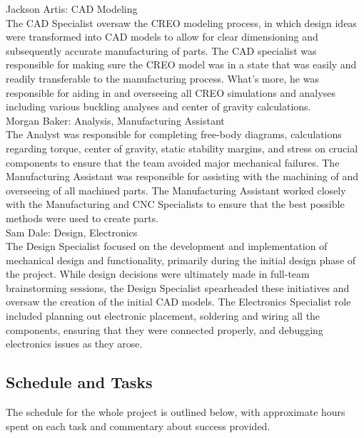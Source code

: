 Jackson Artis: CAD Modeling\\
    
    The CAD Specialist oversaw the CREO modeling process, in which design ideas were transformed into CAD models to allow for clear dimensioning and subsequently accurate manufacturing of parts. The CAD specialist was responsible for making sure the CREO model was in a state that was easily and readily transferable to the manufacturing process. What's more, he was responsible for aiding in and overseeing all CREO simulations and analyses including various buckling analyses and center of gravity calculations. \\ 

Morgan Baker: Analysis, Manufacturing Assistant\\

    The Analyst was responsible for completing free-body diagrams, calculations regarding torque, center of gravity, static stability margins, and stress on crucial components to ensure that the team avoided major mechanical failures. The Manufacturing Assistant was responsible for assisting with the machining of and overseeing of all machined parts. The Manufacturing Assistant worked closely with the Manufacturing and CNC Specialists to ensure that the best possible methods were used to create parts.\\
    
Sam Dale: Design, Electronics\\

    The Design Specialist focused on the development and implementation of mechanical design and functionality, primarily during the initial design phase of the project. While design decisions were ultimately made in full-team brainstorming sessions, the Design Specialist spearheaded these initiatives and oversaw the creation of the initial CAD models. The Electronics Specialist role included planning out electronic placement, soldering and wiring all the components, ensuring that they were connected properly, and debugging electronics issues as they arose.
    

\subsection{Schedule and Tasks}

The schedule for the whole project is outlined below, with approximate hours spent on each task and commentary about success provided.

